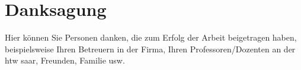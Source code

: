\chapter*{Danksagung}
Hier können Sie Personen danken, die zum Erfolg der Arbeit beigetragen haben, beispielsweise Ihren Betreuern in der Firma, Ihren Professoren/Dozenten an der htw saar, Freunden, Familie usw.
